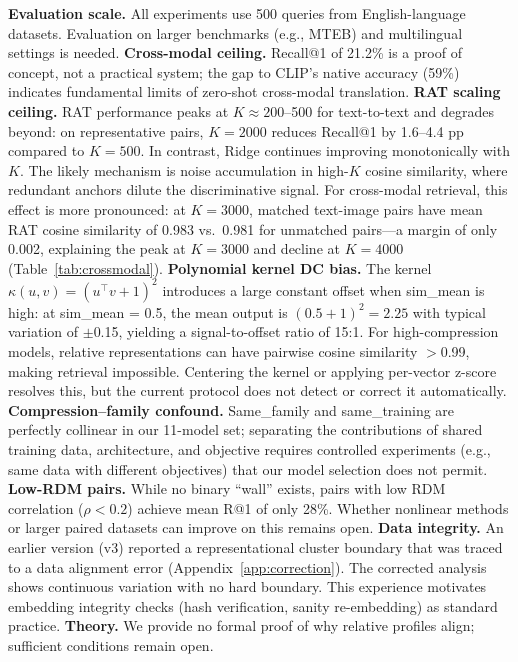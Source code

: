 \documentclass{article}
\begin{document}
\textbf{Evaluation scale.} All experiments use 500 queries from English-language datasets. Evaluation on larger benchmarks (e.g., MTEB) and multilingual settings is needed. \textbf{Cross-modal ceiling.} Recall@1 of 21.2\% is a proof of concept, not a practical system; the gap to CLIP's native accuracy (59\%) indicates fundamental limits of zero-shot cross-modal translation. \textbf{RAT scaling ceiling.} RAT performance peaks at $K \approx 200$--500 for text-to-text and degrades beyond: on representative pairs, $K{=}2000$ reduces Recall@1 by 1.6--4.4 pp compared to $K{=}500$.  In contrast, Ridge continues improving monotonically with $K$.  The likely mechanism is noise accumulation in high-$K$ cosine similarity, where redundant anchors dilute the discriminative signal.  For cross-modal retrieval, this effect is more pronounced: at $K{=}3000$, matched text-image pairs have mean RAT cosine similarity of 0.983 vs.\ 0.981 for unmatched pairs---a margin of only 0.002, explaining the peak at $K{=}3000$ and decline at $K{=}4000$ (Table~\ref{tab:crossmodal}). \textbf{Polynomial kernel DC bias.} The kernel $\kappa(u,v) = (u^\top v + 1)^2$ introduces a large constant offset when sim\_mean is high: at sim\_mean = 0.5, the mean output is $(0.5 + 1)^2 = 2.25$ with typical variation of $\pm$0.15, yielding a signal-to-offset ratio of 15:1. For high-compression models, relative representations can have pairwise cosine similarity $>$0.99, making retrieval impossible. Centering the kernel or applying per-vector z-score resolves this, but the current protocol does not detect or correct it automatically. \textbf{Compression--family confound.} Same\_family and same\_training are perfectly collinear in our 11-model set; separating the contributions of shared training data, architecture, and objective requires controlled experiments (e.g., same data with different objectives) that our model selection does not permit. \textbf{Low-RDM pairs.} While no binary ``wall'' exists, pairs with low RDM correlation ($\rho < 0.2$) achieve mean R@1 of only 28\%. Whether nonlinear methods or larger paired datasets can improve on this remains open. \textbf{Data integrity.} An earlier version (v3) reported a representational cluster boundary that was traced to a data alignment error (Appendix~\ref{app:correction}). The corrected analysis shows continuous variation with no hard boundary. This experience motivates embedding integrity checks (hash verification, sanity re-embedding) as standard practice. \textbf{Theory.} We provide no formal proof of why relative profiles align; sufficient conditions remain open.
\end{document}
